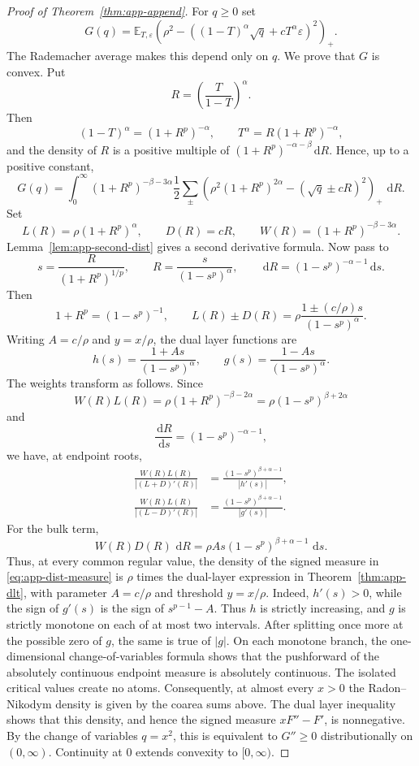 \documentclass[10pt,a4paper]{amsart}
\newcommand{\E}{\mathbb{E}}
\newcommand{\dd}{\,\mathrm{d}}
\newcommand{\eps}{\varepsilon}
\begin{document}
\begin{proof}[Proof of Theorem~\ref{thm:app-append}]
For $q\ge0$ set
\[
 G(q)=\E_{T,\eps}\left(\rho^2-\left((1-T)^\alpha\sqrt q+cT^\alpha\eps\right)^2\right)_+.
\]
The Rademacher average makes this depend only on $q$. We prove that $G$ is convex. Put
\[
 R=\left(\frac{T}{1-T}\right)^\alpha.
\]
Then
\[
 (1-T)^\alpha=(1+R^p)^{-\alpha},
 \qquad
 T^\alpha=R(1+R^p)^{-\alpha},
\]
and the density of $R$ is a positive multiple of $(1+R^p)^{-\alpha-\beta}\dd R$. Hence, up to a positive constant,
\[
G(q)=\int_0^\infty (1+R^p)^{-\beta-3\alpha}\frac12\sum_{\pm}
\left(\rho^2(1+R^p)^{2\alpha}-(\sqrt q\pm cR)^2\right)_+\,\dd R.
\]
Set
\[
 L(R)=\rho(1+R^p)^\alpha,
 \qquad
 D(R)=cR,
 \qquad
 W(R)=(1+R^p)^{-\beta-3\alpha}.
\]
Lemma~\ref{lem:app-second-dist} gives a second derivative formula. Now pass to
\[
 s=\frac{R}{(1+R^p)^{1/p}},
 \qquad
 R=\frac{s}{(1-s^p)^\alpha},
 \qquad
 \dd R=(1-s^p)^{-\alpha-1}\dd s.
\]
Then
\[
 1+R^p=(1-s^p)^{-1},
 \qquad
 L(R)\pm D(R)=\rho\frac{1\pm(c/\rho)s}{(1-s^p)^\alpha}.
\]
Writing $A=c/\rho$ and $y=x/\rho$, the dual layer functions are
\[
 h(s)=\frac{1+As}{(1-s^p)^\alpha},
 \qquad
 g(s)=\frac{1-As}{(1-s^p)^\alpha}.
\]
The weights transform as follows. Since
\[
 W(R)L(R)=\rho(1+R^p)^{-\beta-2\alpha}
 =\rho(1-s^p)^{\beta+2\alpha}
\]
and
\[
 \frac{\dd R}{\dd s}=(1-s^p)^{-\alpha-1},
\]
we have, at endpoint roots,
\begin{align*}
 \frac{W(R)L(R)}{|(L+D)'(R)|}
 &=
 \frac{(1-s^p)^{\beta+\alpha-1}}{|h'(s)|},\\
 \frac{W(R)L(R)}{|(L-D)'(R)|}
 &=
 \frac{(1-s^p)^{\beta+\alpha-1}}{|g'(s)|}.
\end{align*}
For the bulk term,
\[
 W(R)D(R)\,\dd R
 =\rho A s(1-s^p)^{\beta+\alpha-1}\,\dd s.
\]
Thus, at every common regular value, the density of the signed
measure in \eqref{eq:app-dist-measure} is $\rho$ times the dual-layer
expression in Theorem~\ref{thm:app-dlt}, with parameter $A=c/\rho$
and threshold $y=x/\rho$. Indeed, $h'(s)>0$, while the sign of $g'(s)$ is the sign of
$s^{p-1}-A$. Thus $h$ is strictly increasing, and $g$ is strictly
monotone on each of at most two intervals. After splitting once more at
the possible zero of $g$, the same is true of $|g|$. On each monotone
branch, the one-dimensional change-of-variables formula shows that the
pushforward of the absolutely continuous endpoint measure is absolutely
continuous. The isolated critical values create no atoms. Consequently,
at almost every $x>0$ the Radon--Nikodym density is given by the coarea
sums above. The dual layer inequality shows that this density, and hence
the signed measure $xF''-F'$, is nonnegative. By the change of variables $q=x^2$, this is
equivalent to $G''\ge0$ distributionally on $(0,\infty)$. Continuity
at $0$ extends convexity to $[0,\infty)$.


\end{proof}
\end{document}
